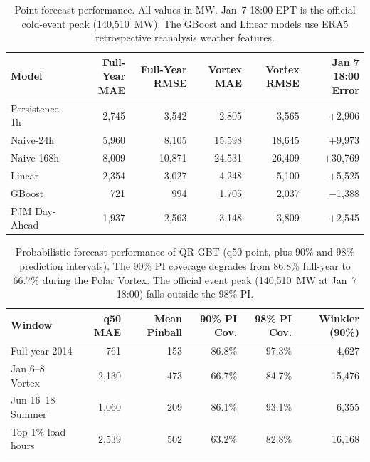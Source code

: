
\begin{table}[htbp]
\centering
\caption{Point forecast performance. All values in MW. Jan~7 18:00 EPT is the official cold-event peak (140,510~MW). The GBoost and Linear models use ERA5 retrospective reanalysis weather features.}
\label{tab:point_metrics}
\begin{tabular}{lrrrrr}
\toprule
Model & Full-Year MAE & Full-Year RMSE & Vortex MAE & Vortex RMSE & Jan 7 18:00 Error \\
\midrule
Persistence-1h & 2,745 & 3,542 & 2,805 & 3,565 & $+$2,906 \\
Naive-24h & 5,960 & 8,105 & 15,598 & 18,645 & $+$9,973 \\
Naive-168h & 8,009 & 10,871 & 24,531 & 26,409 & $+$30,769 \\
Linear & 2,354 & 3,027 & 4,248 & 5,100 & $+$5,525 \\
GBoost & 721 & 994 & 1,705 & 2,037 & $-$1,388 \\
PJM Day-Ahead & 1,937 & 2,563 & 3,148 & 3,809 & $+$2,545 \\
\bottomrule
\end{tabular}
\end{table}


\begin{table}[htbp]
\centering
\caption{Probabilistic forecast performance of QR-GBT (q50 point, plus 90\% and 98\% prediction intervals). The 90\% PI coverage degrades from 86.8\% full-year to 66.7\% during the Polar Vortex. The official event peak (140,510~MW at Jan~7 18:00) falls outside the 98\% PI.}
\label{tab:prob_metrics}
\begin{tabular}{lrrrrr}
\toprule
Window & q50 MAE & Mean Pinball & 90\% PI Cov. & 98\% PI Cov. & Winkler (90\%) \\
\midrule
Full-year 2014 & 761 & 153 & 86.8\% & 97.3\% & 4,627 \\
Jan 6--8 Vortex & 2,130 & 473 & 66.7\% & 84.7\% & 15,476 \\
Jun 16--18 Summer & 1,060 & 209 & 86.1\% & 93.1\% & 6,355 \\
Top 1\% load hours & 2,539 & 502 & 63.2\% & 82.8\% & 16,168 \\
\bottomrule
\end{tabular}
\end{table}

